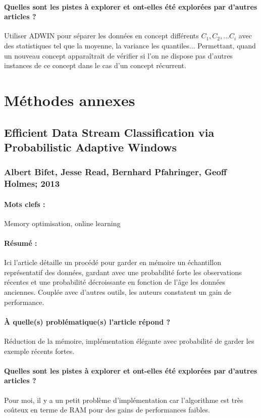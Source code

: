 \documentclass[11pt,a4paper]{report}
\begin{document}
\paragraph{Quelles sont les pistes à explorer et ont-elles  été explorées par d'autres articles ?} Utiliser ADWIN pour séparer les données en concept différents $C_1, C_2, ... C_i$ avec des statistiques tel que la moyenne, la variance les quantiles... Permettant, quand un nouveau concept apparaîtrait de vérifier si l'on ne dispose pas d'autres instances de ce concept dans le cas d'un concept récurrent.



\section{Méthodes annexes}

\subsection{Efficient Data Stream Classification via Probabilistic Adaptive Windows}
\subsubsection{Albert Bifet, Jesse Read, Bernhard Pfahringer, Geoff Holmes; 2013}

\paragraph{Mots clefs :}Memory optimisation, online learning 

\paragraph{Résumé :} Ici l'article détaille un procédé pour garder en mémoire un échantillon représentatif des données, gardant avec une probabilité forte les observations récentes et une probabilité décroissante en fonction de l'âge les données anciennes. Couplée avec d'autres outils, les auteurs constatent un gain de performance.

\paragraph{À quelle(s) problématique(s) l'article répond ?} Réduction de la mémoire, implémentation élégante avec probabilité de garder les exemple récents fortes.

\paragraph{Quelles sont les pistes à explorer et ont-elles  été explorées par d'autres articles ?} Pour moi, il y a un petit problème d'implémentation car l'algorithme est très coûteux en terme de RAM pour des gains de performances faibles.




\newpage
\end{document}
